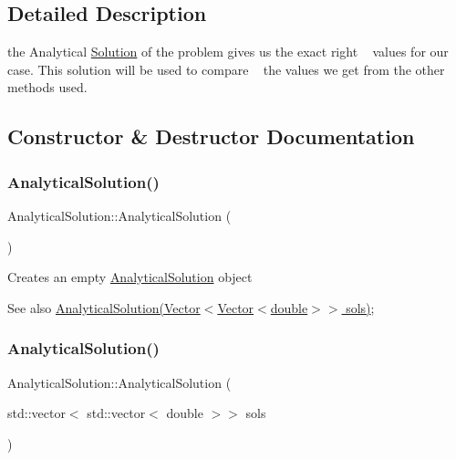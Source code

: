 \subsection{Detailed Description}
the Analytical \hyperlink{class_solution}{Solution} of the problem gives us the exact right ~\newline
 values for our case. This solution will be used to compare ~\newline
 the values we get from the other methods used. 

\subsection{Constructor \& Destructor Documentation}
\mbox{\label{class_analytical_solution_a92a4ce87e863ec7f8aac59372306efd2}} 
\subsubsection{\texorpdfstring{Analytical\+Solution()}{AnalyticalSolution()}\hspace{0.1cm}{\footnotesize\ttfamily [1/2]}}
{\footnotesize\ttfamily Analytical\+Solution\+::\+Analytical\+Solution (\begin{DoxyParamCaption}{ }\end{DoxyParamCaption})}

Creates an empty \hyperlink{class_analytical_solution}{Analytical\+Solution} object \begin{DoxySeeAlso}{See also}
\hyperlink{class_analytical_solution}{Analytical\+Solution(\+Vector$<$\+Vector$<$double$>$$>$ sols)}; 
\end{DoxySeeAlso}
\mbox{\label{class_analytical_solution_a4c948fe197127ca544ac53b6eb0e5b48}} 
\subsubsection{\texorpdfstring{Analytical\+Solution()}{AnalyticalSolution()}\hspace{0.1cm}{\footnotesize\ttfamily [2/2]}}
{\footnotesize\ttfamily Analytical\+Solution\+::\+Analytical\+Solution (\begin{DoxyParamCaption}\item[{std\+::vector$<$ std\+::vector$<$ double $>$$>$}]{sols }\end{DoxyParamCaption})}


